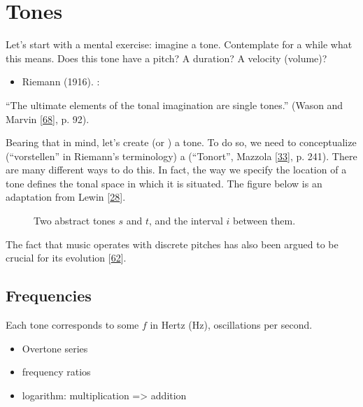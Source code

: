 \documentclass[letterpaper,10pt,english]{sphinxmanual}
\begin{document}
\section{Tones}
\label{\detokenize{1_fundamentals:tones}}
\sphinxAtStartPar
Let’s start with a mental exercise: imagine a tone.
Contemplate for a while what this means.
Does this tone have a pitch? A duration? A velocity (volume)?
\begin{itemize}
\item {} 
\sphinxAtStartPar
Riemann (1916). :

\end{itemize}

\sphinxAtStartPar
“The ultimate elements of the tonal imagination are single tones.”
(Wason and Marvin {[}\hyperlink{cite.8_bibliography:id19}{68}{]}, p. 92).

\sphinxAtStartPar
Bearing that in mind, let’s create (or ) a tone. To do so, we need to
conceptualize (“vorstellen” in Riemann’s terminology) a 
(“Tonort”, Mazzola {[}\hyperlink{cite.8_bibliography:id47}{33}{]}, p. 241).
There are many different ways to do this. In fact, the way we specify the location of a tone
defines the tonal space in which it is situated.
The figure below is an adaptation from Lewin {[}\hyperlink{cite.8_bibliography:id2}{28}{]}.
\begin{figure}[htbp]\centering\capstart{}\caption{Two abstract tones \(s\) and \(t\), and the interval \(i\) between them.}\label{\detokenize{1_fundamentals:id8}}\end{figure}
\sphinxAtStartPar
The fact that music operates with discrete pitches has also been argued to be crucial for its
evolution {[}\hyperlink{cite.8_bibliography:id50}{62}{]}.


\subsection{Frequencies}
\label{\detokenize{1_fundamentals:frequencies}}
\sphinxAtStartPar
Each tone corresponds to some  \(f\) in Hertz (Hz),
oscillations per second.
\begin{itemize}
\item {} 
\sphinxAtStartPar
Overtone series

\item {} 
\sphinxAtStartPar
frequency ratios

\item {} 
\sphinxAtStartPar
logarithm: multiplication =\textgreater{} addition

\end{itemize}
\end{document}
